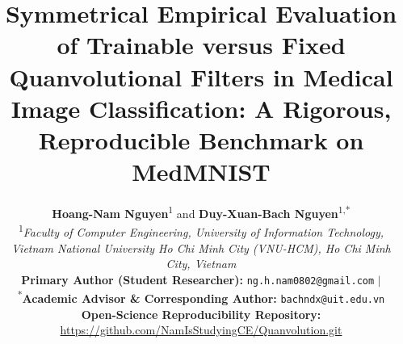 \documentclass[journal]{IEEEtran}
\begin{document}
\title{Symmetrical Empirical Evaluation of Trainable versus Fixed Quanvolutional Filters in Medical Image Classification: A Rigorous, Reproducible Benchmark on MedMNIST}

\author{
    \normalsize \textbf{Hoang-Nam Nguyen}\textsuperscript{1} \quad and \quad \textbf{Duy-Xuan-Bach Nguyen}\textsuperscript{1,*}\\[0.6ex]
    \small \textsuperscript{1}\textit{Faculty of Computer Engineering, University of Information Technology,}\\
    \small \textit{Vietnam National University Ho Chi Minh City (VNU-HCM), Ho Chi Minh City, Vietnam}\\[0.5ex]
    \footnotesize \textbf{Primary Author (Student Researcher):} \texttt{ng.h.nam0802@gmail.com} \quad $\vert$ \quad \textsuperscript{*}\textbf{Academic Advisor \& Corresponding Author:} \texttt{bachndx@uit.edu.vn}\\[0.2ex]
    \footnotesize \textbf{Open-Science Reproducibility Repository:} \url{https://github.com/NamIsStudyingCE/Quanvolution.git}
}

\maketitle
\thispagestyle{empty}
\end{document}
